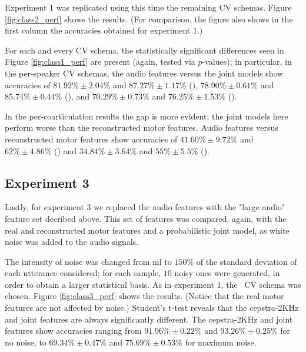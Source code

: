 Experiment 1 was replicated using this time the remaining CV schemas.
Figure \ref{fig:class2_perf} shows the results. (For comparison,
the figure also shows in the first column the accuracies obtained for
experiment $1$.)

For each and every CV schema, the statistically significant differences seen in
Figure \ref{fig:class1_perf} are present (again, tested via $p$-values);
in particular, in the per-speaker CV schemas, the audio features versus
the joint models show accuracies of
$81.92\% \pm 2.04\%$ and $87.27\% \pm 1.17\%$ (\spka),
$78.90\% \pm 0.61\%$ and $85.74\% \pm 0.44\%$ (\spkb), and
$70.29\% \pm 0.73\%$ and $76.25\% \pm 1.53\%$ (\spkc).

In the per-coarticulation results the gap is more evident; the joint models
here perform worse than the reconstructed motor features. Audio features
versus reconstructed motor features show accuracies of
$41.60\% \pm 9.72\%$ and $62\% \pm 4.86\%$ (\coa) and
$34.84\% \pm 3.64\%$ and $55\% \pm 5.5\%$ (\cob).

\subsection{Experiment 3}
\label{subsec:exp3}

Lastly, for experiment 3 we replaced the audio features with
the "large audio" feature set decribed above. This set of
features was compared, again, with the real and reconstructed motor features and
a probabilistic joint model, as white noise was added to the audio signals.

The intensity of noise was changed from nil to $150\%$ of the standard deviation
of each utterance considered; for each sample, $10$ noisy ones were generated, in
order to obtain a larger statistical basis. As in experiment $1$, the \overall\ CV
schema was chosen. Figure \ref{fig:class3_perf} shows the results.
(Notice that the real motor features are not affected by noise.) Student's t-test
reveals that the cepstra-2KHz and joint features are always significantly different.
The cepstra-2KHz and joint features show accuracies ranging from
$91.96\% \pm 0.22\%$ and $93.26\% \pm 0.25\%$ for no noise, to
$69.34\% \pm 0.47\%$ and $75.69\% \pm 0.53\%$ for maximum noise.
